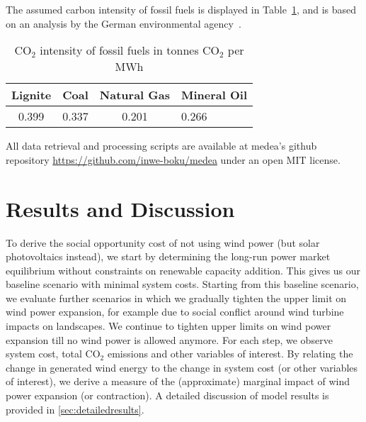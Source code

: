 \documentclass[review, 3p, times]{elsarticle} %
\newcommand{\COO}{\ensuremath{\mathrm{CO_2}} }
\begin{document}
    The assumed carbon intensity of fossil fuels is displayed in Table~\ref{table:carbon-intensity}, and is based on an
    analysis by the German environmental agency~\citep{Juhrich2016}.

    \begin{table}[h!t]
        \centering
        \caption{\COO intensity of fossil fuels in tonnes \COO per MWh}
        \label{table:carbon-intensity}
        \begin{tabular}{c c c l}
            \toprule
            Lignite & Coal & Natural Gas & Mineral Oil   \\
            \midrule
            0.399 & 0.337 & 0.201 & 0.266         \\
            \bottomrule
        \end{tabular}
    \end{table}

    All data retrieval and processing scripts are available at medea's github repository
    \url{https://github.com/inwe-boku/medea} under an open MIT license.


    \section{Results and Discussion} \label{sec:results-discussion}
    To derive the social opportunity cost of not using wind power (but solar photovoltaics instead), we start by
    determining the long-run power market equilibrium without constraints on renewable capacity addition.
    This gives us our baseline scenario with minimal system costs.
    Starting from this baseline scenario, we evaluate further scenarios in which we gradually tighten the upper limit
    on wind power expansion, for example due to social conflict around wind turbine impacts on landscapes.
    We continue to tighten upper limits on wind power expansion till no wind power is allowed anymore.
    For each step, we observe system cost, total \COO emissions and other variables of interest.
    By relating the change in generated wind energy to the change in system cost (or other variables of interest), we
    derive a measure of the (approximate) marginal impact of wind power expansion (or contraction).
    A detailed discussion of model results is provided in \ref{sec:detailedresults}.
\end{document}
